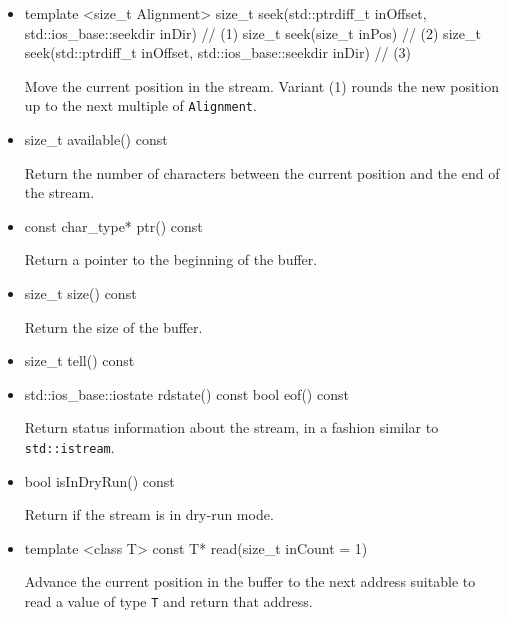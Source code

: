 \begin{itemize}
	\item
		\begin{cppsnippet}
		template <size_t Alignment>
		size_t seek(std::ptrdiff_t inOffset, std::ios_base::seekdir inDir) // (1)
		size_t seek(size_t inPos) // (2)
		size_t seek(std::ptrdiff_t inOffset, std::ios_base::seekdir inDir) // (3)
		\end{cppsnippet}

		Move the current position in the stream. Variant (1) rounds the new position up to the next multiple of \texttt{Alignment}.

	\item
		\begin{cppsnippet}
		size_t available() const
		\end{cppsnippet}

		Return the number of characters between the current position and the end of the stream.

	\item
		\begin{cppsnippet}
		const char_type* ptr() const
		\end{cppsnippet}

		Return a pointer to the beginning of the buffer.

	\item
		\begin{cppsnippet}
		size_t size() const
		\end{cppsnippet}

		Return the size of the buffer.

	\item
		\begin{cppsnippet}
		size_t tell() const
		\end{cppsnippet}

	\item
		\begin{cppsnippet}
		std::ios_base::iostate rdstate() const
		bool eof() const
		\end{cppsnippet}

		Return status information about the stream, in a fashion similar to \texttt{std::istream}.
	\item
		\begin{cppsnippet}
		bool isInDryRun() const
		\end{cppsnippet}

		Return if the stream is in dry-run mode.

	\item
		\begin{cppsnippet}
		template <class T> const T* read(size_t inCount = 1)
		\end{cppsnippet}

		Advance the current position in the buffer to the next address suitable to read a value of type \texttt{T} and return that address.
\end{itemize}

